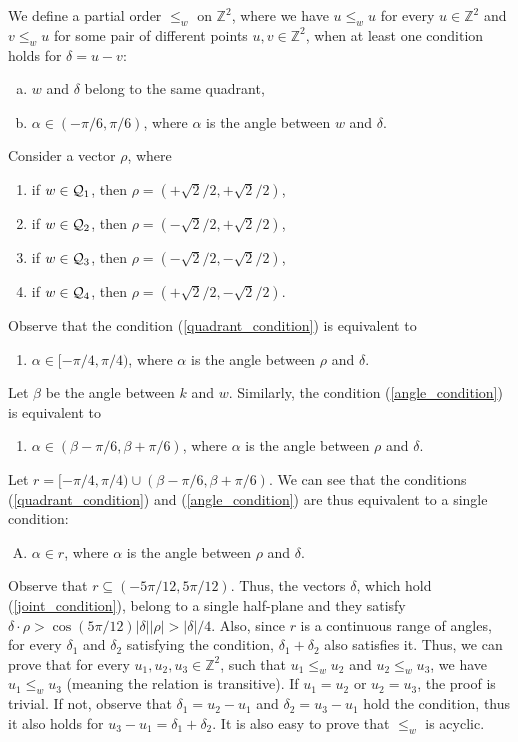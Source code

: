\documentclass[11pt]{article}
\newcommand{\Z}{\mathbb{Z}}
\theoremstyle{plain}
\theoremstyle{definition}
\theoremstyle{remark}
\begin{document}
We define a partial order $\le_{w}$ on $\Z^2$, where we have $u \le_w u$ for every $u \in \Z^2$ and $v \le_w u$ for some pair of different points $u, v \in \Z^2$, when at least one condition holds for $\delta = u - v$:
\begin{enumerate}[a)]
	\item $w$ and $\delta$ belong to the same quadrant, \label{quadrant_condition}
	\item $\alpha \in (-\pi / 6, \pi / 6)$, where $\alpha$ is the angle between $w$ and $\delta$. \label{angle_condition}
\end{enumerate}
Consider a vector $\rho$, where
\begin{enumerate}[$1^\circ$]
	\item if $w \in \mathcal{Q}_1$, then $\rho = (+\sqrt{2} / 2, +\sqrt{2} / 2)$,
	\item if $w \in \mathcal{Q}_2$, then $\rho = (-\sqrt{2} / 2, +\sqrt{2} / 2)$,
	\item if $w \in \mathcal{Q}_3$, then $\rho = (-\sqrt{2} / 2, -\sqrt{2} / 2)$,
	\item if $w \in \mathcal{Q}_4$, then $\rho = (+\sqrt{2} / 2, -\sqrt{2} / 2)$.
\end{enumerate}
Observe that the condition (\ref{quadrant_condition}) is equivalent to
\begin{enumerate}[a')]
	\item $\alpha \in [-\pi / 4, \pi / 4)$, where $\alpha$ is the angle between $\rho$ and $\delta$.
\end{enumerate}
Let $\beta$ be the angle between $k$ and $w$. Similarly, the condition (\ref{angle_condition}) is equivalent to
\begin{enumerate}[b')]
	\item $\alpha \in (\beta - \pi / 6, \beta + \pi / 6)$, where $\alpha$ is the angle between $\rho$ and $\delta$. 
\end{enumerate}
Let $r = [-\pi / 4, \pi / 4) \cup (\beta - \pi / 6, \beta + \pi / 6)$. 
We can see that the conditions (\ref{quadrant_condition}) and (\ref{angle_condition}) are thus equivalent to a single condition:
\begin{enumerate}[A)]
	\item $\alpha \in r$, where $\alpha$ is the angle between $\rho$ and $\delta$. \label{joint_condition}
\end{enumerate}
Observe that $r \subseteq (-5 \pi / 12, 5 \pi / 12)$.
Thus, the vectors $\delta$, which hold (\ref{joint_condition}), belong to a single half-plane and they satisfy $\delta \cdot \rho > \cos(5\pi / 12)|\delta||\rho| > |\delta| / 4$.
Also, since $r$ is a continuous range of angles, for every $\delta_1$ and $\delta_2$ satisfying the condition, $\delta_1 + \delta_2$ also satisfies it.
Thus, we can prove that for every $u_1, u_2, u_3 \in \Z^2$, such that $u_1 \le_w u_2$ and $u_2 \le_w u_3$, we have $u_1 \le_w u_3$ (meaning the relation is transitive).
If $u_1 = u_2$ or $u_2 = u_3$, the proof is trivial.
If not, observe that $\delta_1 = u_2 - u_1$ and $\delta_2 = u_3 - u_1$ hold the condition, 
thus it also holds for $u_3 - u_1 = \delta_1 + \delta_2$.
It is also easy to prove that $\le_w$ is acyclic.
\end{document}
